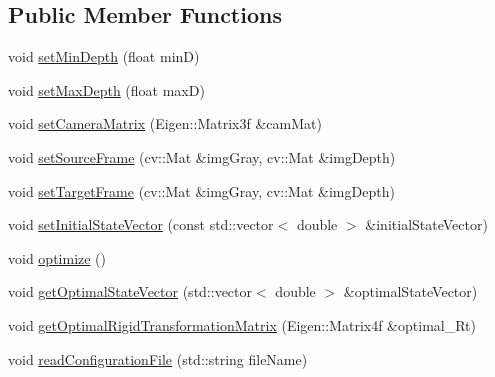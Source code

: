 \subsection*{Public Member Functions}
\begin{DoxyCompactItemize}
\item 
void \hyperlink{class_photoconsistency_odometry_1_1_bi_objective_1_1_c_photoconsistency_odometry_bi_objective_a558ea77216fdd1423f601107774d794e}{setMinDepth} (float minD)
\item 
void \hyperlink{class_photoconsistency_odometry_1_1_bi_objective_1_1_c_photoconsistency_odometry_bi_objective_aa115dd864e3bea5b1db3bff97890c9e9}{setMaxDepth} (float maxD)
\item 
void \hyperlink{class_photoconsistency_odometry_1_1_bi_objective_1_1_c_photoconsistency_odometry_bi_objective_a8f2e9f8a20c2496032577e5a7e50e506}{setCameraMatrix} (Eigen::Matrix3f \&camMat)
\item 
void \hyperlink{class_photoconsistency_odometry_1_1_bi_objective_1_1_c_photoconsistency_odometry_bi_objective_acb6628a7f90ffd52798f61fdec55db0b}{setSourceFrame} (cv::Mat \&imgGray, cv::Mat \&imgDepth)
\item 
void \hyperlink{class_photoconsistency_odometry_1_1_bi_objective_1_1_c_photoconsistency_odometry_bi_objective_ace2177b6d8081644465bad2b1fc4e176}{setTargetFrame} (cv::Mat \&imgGray, cv::Mat \&imgDepth)
\item 
void \hyperlink{class_photoconsistency_odometry_1_1_bi_objective_1_1_c_photoconsistency_odometry_bi_objective_a1e129e5db719ecf0365c40a09a26f9f0}{setInitialStateVector} (const std::vector$<$ double $>$ \&initialStateVector)
\item 
void \hyperlink{class_photoconsistency_odometry_1_1_bi_objective_1_1_c_photoconsistency_odometry_bi_objective_a653474944f8cea88fc98074d3da4b551}{optimize} ()
\item 
void \hyperlink{class_photoconsistency_odometry_1_1_bi_objective_1_1_c_photoconsistency_odometry_bi_objective_acc57b9e6e38f85071f747d935023e7fd}{getOptimalStateVector} (std::vector$<$ double $>$ \&optimalStateVector)
\item 
void \hyperlink{class_photoconsistency_odometry_1_1_bi_objective_1_1_c_photoconsistency_odometry_bi_objective_a1115655df7094d0566b786433fb0a223}{getOptimalRigidTransformationMatrix} (Eigen::Matrix4f \&optimal\_\-Rt)
\item 
void \hyperlink{class_photoconsistency_odometry_1_1_bi_objective_1_1_c_photoconsistency_odometry_bi_objective_af2aebdd1dde2b510c854ea029b228d49}{readConfigurationFile} (std::string fileName)
\end{DoxyCompactItemize}
